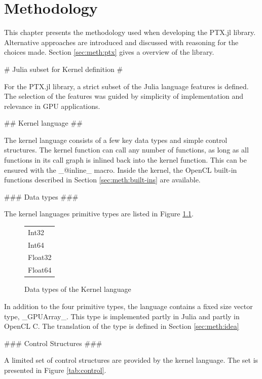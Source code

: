 \chapter{Methodology}
\label{chap:meth}
\begin{markdown}

This chapter presents the methodology used when developing the PTX.jl
library. Alternative approaches are introduced and discussed with
reasoning for the choices made. Section \ref{sec:meth:ptx} gives a
overview of the library.

# Julia subset for Kernel definition #

For the PTX.jl library, a strict subset of the Julia language features
is defined. The selection of the features was guided by simplicity
of implementation and relevance in GPU applications.

## Kernel language ##
\label{sec:meth:kernel}

The kernel language consists of a few key data types and simple control
structures. The kernel function can call any number of functions, as
long as all functions in its call graph is inlined back into the
kernel function. This can be ensured with the _@inline_ macro. Inside
the kernel, the OpenCL built-in functions described in Section
\ref{sec:meth:built-ins} are available.

### Data types ###

The kernel languages primitive types are listed in Figure \ref{tab:datatypes}.

\begin{figure}[H]
  \centering
  \begin{tabular}{|l|}
  \hline
  Int32\\
  Int64\\
  Float32\\
  Float64\\
  \hline
  \end{tabular}
  \caption{Data types of the Kernel language}
  \label{tab:datatypes}
\end{figure}

In addition to the four primitive types, the language contains a fixed
size vector type, _GPUArray_. This type is implemented partly in Julia
and partly in OpenCL C. The translation of the type is defined in
Section \ref{sec:meth:idea}

### Control Structures ###

A limited set of control structures are provided by the kernel
language. The set is presented in Figure \ref{tab:control}.


\end{markdown}
